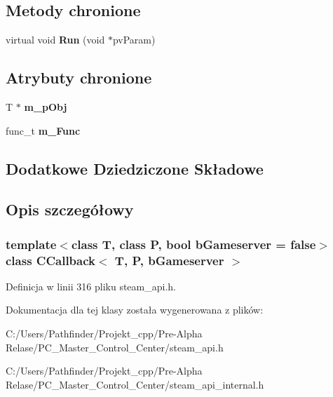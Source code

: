 \subsection*{Metody chronione}
\begin{DoxyCompactItemize}
\item 
\mbox{\label{class_c_callback_a7a2e667e1ec3e20586fbe32ad4740cdc}} 
virtual void {\bfseries Run} (void $\ast$pv\+Param)
\end{DoxyCompactItemize}
\subsection*{Atrybuty chronione}
\begin{DoxyCompactItemize}
\item 
\mbox{\label{class_c_callback_adab4cdae2184c38ca20f27645a0ae6fe}} 
T $\ast$ {\bfseries m\+\_\+p\+Obj}
\item 
\mbox{\label{class_c_callback_a7698d2948fe019db0db429777a4beff5}} 
func\+\_\+t {\bfseries m\+\_\+\+Func}
\end{DoxyCompactItemize}
\subsection*{Dodatkowe Dziedziczone Składowe}


\subsection{Opis szczegółowy}
\subsubsection*{template$<$class T, class P, bool b\+Gameserver = false$>$\newline
class C\+Callback$<$ T, P, b\+Gameserver $>$}



Definicja w linii 316 pliku steam\+\_\+api.\+h.



Dokumentacja dla tej klasy została wygenerowana z plików\+:\begin{DoxyCompactItemize}
\item 
C\+:/\+Users/\+Pathfinder/\+Projekt\+\_\+cpp/\+Pre-\/\+Alpha Relase/\+P\+C\+\_\+\+Master\+\_\+\+Control\+\_\+\+Center/steam\+\_\+api.\+h\item 
C\+:/\+Users/\+Pathfinder/\+Projekt\+\_\+cpp/\+Pre-\/\+Alpha Relase/\+P\+C\+\_\+\+Master\+\_\+\+Control\+\_\+\+Center/steam\+\_\+api\+\_\+internal.\+h\end{DoxyCompactItemize}
